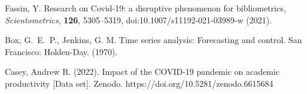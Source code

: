 \documentclass[]{rsos}%
\begin{document}
\begin{thebibliography}{10}
{Fassin, Y.} {Research on Covid-19: a disruptive phenomenon for bibliometrics}, \emph{Scientometrics}, \textbf{126}, 5305--5319, doi:10.1007/s11192-021-03989-w \newblock (2021).

{Box, G.~E.~P., Jenkins, G. M.} Time series analysis: Forecasting and control. San Francisco: Holden-Day. \newblock (1970).

 Casey, Andrew R. (2022). Impact of the COVID-19 pandemic on academic productivity [Data set]. Zenodo. https://doi.org/10.5281/zenodo.6615684

\end{thebibliography}
\end{document}
